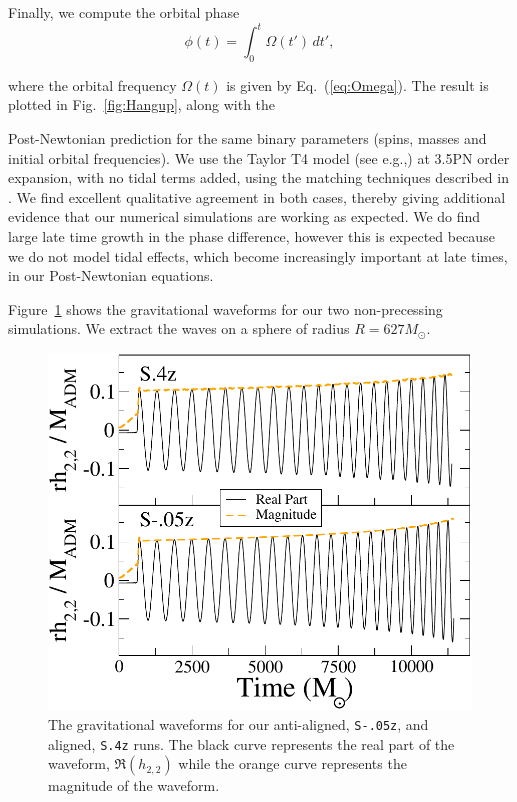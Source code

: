{Finally, we compute the orbital phase 
\begin{equation}
\phi(t) = \int_0^t \Omega(t')\, dt',
\end{equation}

where the orbital frequency $\Omega(t)$ is given by
Eq.~(\ref{eq:Omega}).
The result is plotted in Fig.~\ref{fig:Hangup}, along with the

Post-Newtonian prediction for the same binary parameters (spins,
masses and initial orbital frequencies). We use the Taylor T4 model (see e.g.,\cite{Boyle2007}) at 3.5PN order expansion, with no tidal terms added, using
the matching techniques described in \cite{OssokineEtAl:2014}. We find
excellent qualitative agreement in both cases, thereby giving
additional evidence that our numerical simulations are working as
expected. We do find large late time growth in the phase difference,
however this is expected because we do not model tidal effects, which
become increasingly important at late times, in our
Post-Newtonian equations.


Figure~\ref{fig:AlignedGW} shows the gravitational waveforms for our
two non-precessing simulations. We extract the waves on a sphere of
radius $R=627M_{\odot}$. 


\begin{figure}
\includegraphics[width=0.95\columnwidth]{chap2/AlignedGW}
\caption[The gravitational waveforms for our anti-aligned and aligned runs.] { {\label{fig:AlignedGW}} The gravitational waveforms for our
  anti-aligned, {\tt S-.05z}, and aligned, {\tt S.4z} runs. The black curve
  represents the real part of the waveform, $\Re(h_{2,2})$ while the
  orange curve represents the magnitude of the waveform.}
\end{figure}





}
